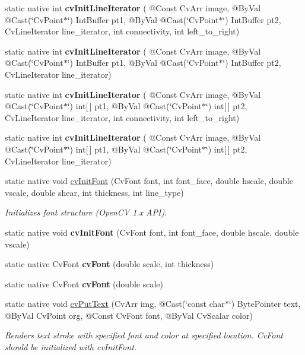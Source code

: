 \begin{DoxyCompactItemize}
static native int {\bfseries cv\+Init\+Line\+Iterator} ( @Const Cv\+Arr image, @By\+Val @Cast(\char`\"{}Cv\+Point$\ast$\char`\"{}) Int\+Buffer pt1, @By\+Val @Cast(\char`\"{}Cv\+Point$\ast$\char`\"{}) Int\+Buffer pt2, Cv\+Line\+Iterator line\+\_\+iterator, int connectivity, int left\+\_\+to\+\_\+right)
\item 
static native int {\bfseries cv\+Init\+Line\+Iterator} ( @Const Cv\+Arr image, @By\+Val @Cast(\char`\"{}Cv\+Point$\ast$\char`\"{}) Int\+Buffer pt1, @By\+Val @Cast(\char`\"{}Cv\+Point$\ast$\char`\"{}) Int\+Buffer pt2, Cv\+Line\+Iterator line\+\_\+iterator)
\item 
static native int {\bfseries cv\+Init\+Line\+Iterator} ( @Const Cv\+Arr image, @By\+Val @Cast(\char`\"{}Cv\+Point$\ast$\char`\"{}) int\mbox{[}$\,$\mbox{]} pt1, @By\+Val @Cast(\char`\"{}Cv\+Point$\ast$\char`\"{}) int\mbox{[}$\,$\mbox{]} pt2, Cv\+Line\+Iterator line\+\_\+iterator, int connectivity, int left\+\_\+to\+\_\+right)
\item 
static native int {\bfseries cv\+Init\+Line\+Iterator} ( @Const Cv\+Arr image, @By\+Val @Cast(\char`\"{}Cv\+Point$\ast$\char`\"{}) int\mbox{[}$\,$\mbox{]} pt1, @By\+Val @Cast(\char`\"{}Cv\+Point$\ast$\char`\"{}) int\mbox{[}$\,$\mbox{]} pt2, Cv\+Line\+Iterator line\+\_\+iterator)
\item 
static native void \hyperlink{group__imgproc__c_ga7802f35f4ff9683ba622d633d5b17a25}{cv\+Init\+Font} (Cv\+Font font, int font\+\_\+face, double hscale, double vscale, double shear, int thickness, int line\+\_\+type)
\begin{DoxyCompactList}\small\item\em Initializes font structure (Open\+CV 1.\+x A\+PI). \end{DoxyCompactList}\item 
static native void {\bfseries cv\+Init\+Font} (Cv\+Font font, int font\+\_\+face, double hscale, double vscale)
\item 
static native Cv\+Font {\bfseries cv\+Font} (double scale, int thickness)
\item 
static native Cv\+Font {\bfseries cv\+Font} (double scale)
\item 
static native void \hyperlink{group__imgproc__c_gaa0527c4e076b98ec48324b7585ca98df}{cv\+Put\+Text} (Cv\+Arr img, @Cast(\char`\"{}const char$\ast$\char`\"{}) Byte\+Pointer text, @By\+Val Cv\+Point org, @Const Cv\+Font font, @By\+Val Cv\+Scalar color)
\begin{DoxyCompactList}\small\item\em Renders text stroke with specified font and color at specified location. Cv\+Font should be initialized with cv\+Init\+Font. \end{DoxyCompactList}\item 

\end{DoxyCompactItemize}
